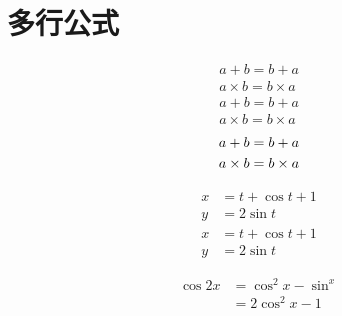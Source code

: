 \documentclass{ctexart}%
\begin{document}
     \section{多行公式}
     \begin{gather}
     	a + b = b + a \\
     	a \times b = b \times a 
     \end{gather}
     \begin{gather*}
        a + b = b + a \\
        a \times b = b \times a 
     \end{gather*}
     \begin{gather}
     	a + b = b + a \notag \\
     	a \times b = b \times a 
     \end{gather}
     
     \begin{align}
     	x & = t + \cos t + 1 \\
     	y & = 2\sin t
     \end{align} 
     \begin{align*}
         x & = t + \cos t + 1 \\
         y & = 2\sin t
     \end{align*}
     
     \begin{equation}
     \begin{split}
     \cos 2x &= \cos^2 x - \sin^x \\
     &= 2\cos^2 x - 1
     \end{split}
     \end{equation}
     
\end{document}
